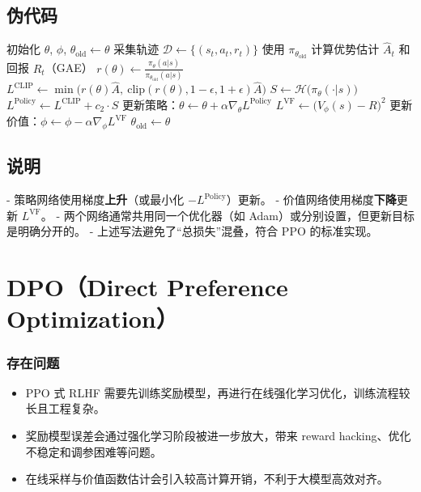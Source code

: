 \documentclass[UTF8]{ctexart}
\begin{document}
\subsection*{伪代码}
\begin{algorithm}[H]
\caption{PPO-Clip 算法（Actor-Critic 版本）}
\begin{algorithmic}[1]
\State 初始化 $\theta$, $\phi$, $\theta_{\text{old}} \gets \theta$
    \State 采集轨迹 $\mathcal{D} \gets \{(s_t, a_t, r_t)\}$ 使用 $\pi_{\theta_{\text{old}}}$
    \State 计算优势估计 $\hat{A}_t$ 和回报 $R_t$（GAE）
            \State $r(\theta) \gets \frac{\pi_{\theta}(a|s)}{\pi_{\theta_{\text{old}}}(a|s)}$
            \State $L^{\text{CLIP}} \gets \min\big(r(\theta)\hat{A},\ \text{clip}(r(\theta),1-\epsilon,1+\epsilon)\hat{A}\big)$
            \State $S \gets \mathcal{H}\big(\pi_{\theta}(\cdot|s)\big)$
            \State $L^{\text{Policy}} \gets L^{\text{CLIP}} + c_2 \cdot S$   
            \State 更新策略：$\theta \gets \theta + \alpha \nabla_{\theta} L^{\text{Policy}}$
            \State $L^{\text{VF}} \gets \big(V_{\phi}(s) - R\big)^2$ 
            \State 更新价值：$\phi \gets \phi - \alpha \nabla_{\phi} L^{\text{VF}}$
        \EndFor
    \EndFor
    \State $\theta_{\text{old}} \gets \theta$
\EndFor
\end{algorithmic}
\end{algorithm}

\subsection*{说明}
- 策略网络使用梯度\textbf{上升}（或最小化 $-L^{\text{Policy}}$）更新。
- 价值网络使用梯度\textbf{下降}更新 $L^{\text{VF}}$。
- 两个网络通常共用同一个优化器（如 Adam）或分别设置，但更新目标是明确分开的。
- 上述写法避免了“总损失”混叠，符合 PPO 的标准实现。

\section{DPO（Direct Preference Optimization）}

\subsubsection{存在问题}

\begin{itemize}
    \item PPO 式 RLHF 需要先训练奖励模型，再进行在线强化学习优化，训练流程较长且工程复杂。
    \item 奖励模型误差会通过强化学习阶段被进一步放大，带来 reward hacking、优化不稳定和调参困难等问题。
    \item 在线采样与价值函数估计会引入较高计算开销，不利于大模型高效对齐。
\end{itemize}
\end{document}
